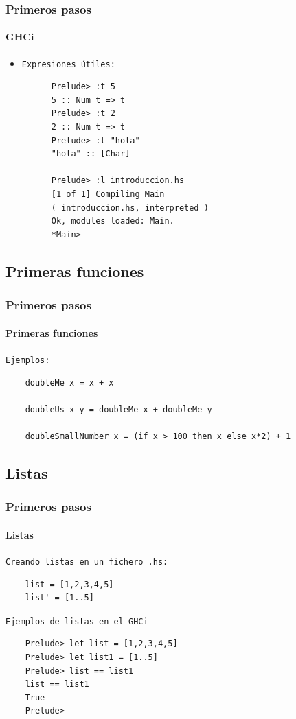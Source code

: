 \documentclass{beamer}
\begin{document}
\begin{frame}[fragile]
  \frametitle{Primeros pasos}
  \framesubtitle{GHCi}
  \begin{itemize}
  \item\texttt{Expresiones útiles:}
    \begin{verbatim}
      Prelude> :t 5
      5 :: Num t => t
      Prelude> :t 2
      2 :: Num t => t
      Prelude> :t "hola"
      "hola" :: [Char]

      Prelude> :l introduccion.hs
      [1 of 1] Compiling Main
      ( introduccion.hs, interpreted )
      Ok, modules loaded: Main.
      *Main>
    \end{verbatim}
  \end{itemize}
\end{frame}

\subsection{Primeras funciones}
\begin{frame}[fragile]
  \frametitle{Primeros pasos}
  \framesubtitle{Primeras funciones}

  \texttt{Ejemplos:}
  \begin{verbatim}
    doubleMe x = x + x

    doubleUs x y = doubleMe x + doubleMe y

    doubleSmallNumber x = (if x > 100 then x else x*2) + 1
  \end{verbatim}
\end{frame}

\subsection{Listas}
\begin{frame}[fragile]
  \frametitle{Primeros pasos}
  \framesubtitle{Listas}
  \texttt{Creando listas en un fichero \verb~.hs~:}
  \begin{verbatim}
    list = [1,2,3,4,5]
    list' = [1..5]
  \end{verbatim}
  \texttt{Ejemplos de listas en el GHCi}
  \begin{verbatim}
    Prelude> let list = [1,2,3,4,5]
    Prelude> let list1 = [1..5]
    Prelude> list == list1
    list == list1
    True
    Prelude>
  \end{verbatim}
\end{frame}
\end{document}
